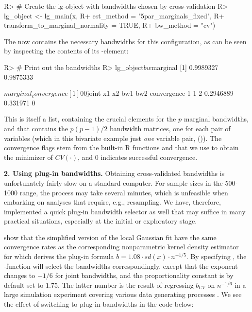 \begin{example}
R> # Create the lg-object with bandwidths chosen by cross-validation
R> lg_object <- lg_main(x,
R+                      est_method = "5par_marginals_fixed",
R+                      transform_to_marginal_normality = TRUE,
R+                      bw_method = "cv")
\end{example}

The  now contains the necessary bandwidths for this configuration, as can be seen by inspecting the contents of its
-element:

\begin{example}
R> # Print out the bandwidths
R> lg_object$bw

$marginal
[1] 0.9989327 0.9875333

$marginal_convergence
[1] 0 0

$joint
x1 x2         bw1      bw2 convergence
1  1  2 0.2946889 0.331971           0
\end{example}
This is itself a list, containing the crucial elements  for the \(p\) marginal bandwidths, and  that contains the
\(p(p-1)/2\) bandwidth matrices, one for each pair of variables (which in this bivariate example just \emph{one} variable pair, ()). The convergence flags stem from the built-in R functions  and  that we use to obtain the minimizer of \(CV\left(\cdot\right)\), and 0 indicates successful convergence.

\textbf{2. Using plug-in bandwidths.} Obtaining cross-validated bandwidths is unfortunately fairly slow on a standard computer. For sample sizes in the 500-1000 range, the process may take several minutes, which is unfeasible when embarking on analyses that require, e.g., resampling. We have, therefore, implemented a quick plug-in bandwidth selector as well that may suffice in many practical situations, especially at the initial or exploratory stage. 

\citet{otne:tjos:2017} show that the simplified version of the local Gaussian fit have the same convergence rates as the corresponding nonparametric kernel density estimator for which \citet{silv:1986} derives the plug-in formula \(b = 1.08\cdot sd\left(x\right) \cdot n^{-1/5}\). By
specifying , the -function will select the bandwidths correspondingly, except that the exponent changes to \(-1/6\) for joint bandwidths, and the proportionality constant is by default set to \(1.75\). The latter number is the result of regressing \(b_{CV}\) on \(n^{-1/6}\) in a large simulation experiment covering various data generating processes \citep{otneim2016multivariate}. We see the effect of switching to plug-in bandwidths in the code below: 

